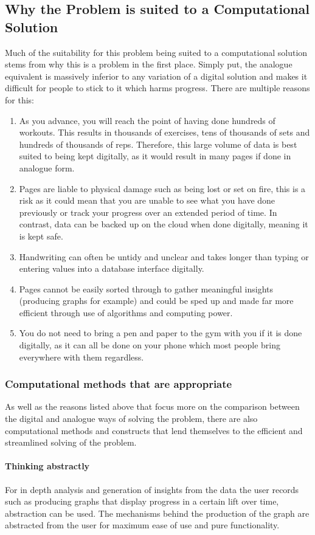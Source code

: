 \documentclass{article}
\begin{document}
\subsection{Why the Problem is suited to a Computational Solution}
Much of the suitability for this problem being suited to a computational solution stems from why this is a problem in the first place. Simply put, the analogue equivalent is massively inferior to any variation of a digital solution and makes it difficult for people to stick to it which harms progress. There are multiple reasons for this:
\begin{enumerate}
  \item As you advance, you will reach the point of having done hundreds of workouts. This results in thousands of exercises, tens of thousands of sets and hundreds of thousands of reps. Therefore, this large volume of data is best suited to being kept digitally, as it would result in many pages if done in analogue form.
  \item Pages are liable to physical damage such as being lost or set on fire, this is a risk as it could mean that you are unable to see what you have done previously or track your progress over an extended period of time. In contrast, data can be backed up on the cloud when done digitally, meaning it is kept safe.
  \item Handwriting can often be untidy and unclear and takes longer than typing or entering values into a database interface digitally. 
  \item Pages cannot be easily sorted through to gather meaningful insights (producing graphs for example) and could be sped up and made far more efficient through use of algorithms and computing power. 
  \item You do not need to bring a pen and paper to the gym with you if it is done digitally, as it can all be done on your phone which most people bring everywhere with them regardless. 
\end{enumerate}
\subsubsection{Computational methods that are appropriate}
As well as the reasons listed above that focus more on the comparison between the digital and analogue ways of solving the problem, there are also computational methods and constructs that lend themselves to the efficient and streamlined solving of the problem.
\paragraph{Thinking abstractly}
For in depth analysis and generation of insights from the data the user records such as producing graphs that display progress in a certain lift over time, abstraction can be used. The mechanisms behind the production of the graph are abstracted from the user for maximum ease of use and pure functionality. 
\end{document}
